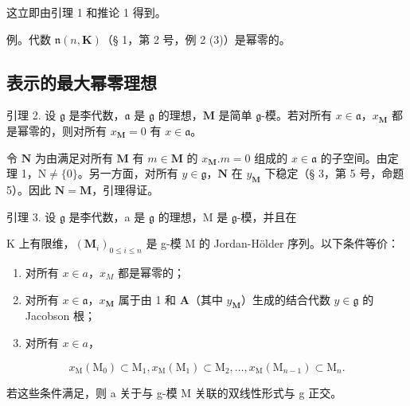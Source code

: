 这立即由引理 1 和推论 1 得到。

例。代数 \(\mathfrak{n}(n,\mathbf{K})\)（§ 1，第 2 号，例 2 (3)）是幂零的。

\subsection{表示的最大幂零理想}

引理 2. 设 \(\mathfrak{g}\) 是李代数，\(\mathfrak{a}\) 是 \(\mathfrak{g}\) 的理想，\(\mathbf{M}\) 是简单 \(\mathfrak{g}\)-模。若对所有 \(x \in \mathfrak{a}\)，\(x_{\mathbf{M}}\) 都是幂零的，则对所有 \(x_{\mathbf{M}} = 0\) 有 \(x \in \mathfrak{a}\)。

令 \(\mathbf{N}\) 为由满足对所有 \(\mathbf{M}\) 有 \(m \in \mathbf{M}\) 的 \(x_{\mathbf{M}}.m = 0\) 组成的 \(x \in \mathfrak{a}\) 的子空间。由定理 1，\(\mathrm{N} \neq \{0\}\)。另一方面，对所有 \(y \in \mathfrak{g}\)，\(\mathbf{N}\) 在 \(y_{\mathbf{M}}\) 下稳定（§ 3，第 5 号，命题 5）。因此 \(\mathbf{N} = \mathbf{M}\)，引理得证。

引理 3. 设 \(\mathfrak{g}\) 是李代数，a 是 \(\mathfrak{g}\) 的理想，M 是 \(\mathfrak{g}\)-模，并且在

K 上有限维，\((\mathbf{M}_{i})_{0\leqslant i\leqslant n}\) 是 g-模 M 的 Jordan-Hölder 序列。以下条件等价：

\begin{enumerate}
\def\labelenumi{(\alph{enumi})}
\item
  对所有 \(x \in a\)，\(x_{M}\) 都是幂零的；
\item
  对所有 \(x \in \mathfrak{a}\)，\(x_{\mathbf{M}}\) 属于由 1 和 \(\mathbf{A}\)（其中 \(y_{\mathbf{M}}\)）生成的结合代数 \(y \in \mathfrak{g}\) 的 Jacobson 根；
\item
  对所有 \(x \in a\)，
\end{enumerate}

\[
x _ {\mathrm{M}} \left(\mathrm{M} _ {0}\right) \subset \mathrm{M} _ {1}, x _ {\mathrm{M}} \left(\mathrm{M} _ {1}\right) \subset \mathrm{M} _ {2}, \dots , x _ {\mathrm{M}} \left(\mathrm{M} _ {n - 1}\right) \subset \mathrm{M} _ {n}.
\]

若这些条件满足，则 a 关于与 g-模 M 关联的双线性形式与 g 正交。

